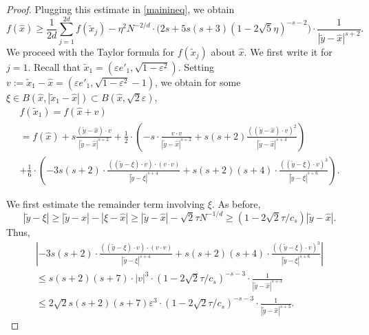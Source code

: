 \documentclass[12pt]{amsart}
\theoremstyle{definition}
\def\sli{\sum\limits}
\def\ep{\varepsilon}
\newcommand{\1}{\mathbf{1}}
\begin{document}
\begin{proof}
Plugging this estimate in \eqref{mainineq}, we obtain
\begin{equation}\label{mainineq2}
f(\hat{x}) \geqslant \frac{1}{2d}\sli_{j=1}^{2d}f(\tilde{x}_j) - \eta^2 N^{-2/d}\cdot \Big(2s+5s (s+3)(1-2\sqrt{5}\eta)^{-s-2}\Big)\cdot \frac{1}{|\tilde y-\hat{x}|^{s+2}}.
\end{equation}
We proceed with the Taylor formula for $f(\tilde x_j)$ about $\hat{x}$. We first write it for $j=1$. Recall that $\tilde{x}_1 = (\ep e'_1, \sqrt{1-\ep^2})$. Setting $v:=\tilde{x}_1-\hat{x} = (\ep e'_1, \sqrt{1-\ep^2}-1)$, we obtain for some \\ $\xi \in B(\hat{x}, |\tilde x_1-\hat{x}|) \subset B(\hat{x}, \sqrt{2}\ep)$,
\begin{multline}\label{supertaylor}
f(\tilde x_1)=f(\hat{x}+v) \\= f(\hat{x})+s\frac{(\tilde y-\hat{x})\cdot v}{|\tilde y-\hat{x}|^{s+2}} +
\frac12 \cdot \left(-s\cdot \frac{v\cdot v}{|\tilde y-\hat{x}|^{s+2}}+s(s+2)\frac{((\tilde y-\hat{x})\cdot v)^2}{|\tilde y-\hat{x}|^{s+4}}\right)  \\
+ \frac16 \cdot \left(-3s(s+2)\cdot \frac{((\tilde y-\xi)\cdot v)\cdot (v\cdot v)}{|\tilde y-\xi|^{s+4}} + s(s+2)(s+4)\cdot \frac{((\tilde y-\xi)\cdot v)^3}{|\tilde y-\xi|^{s+6}}\right).
\end{multline}
 
We first estimate the remainder term involving $\xi$. As before,
$$
|\tilde y-\xi|\geqslant |\tilde y - \hat{x}| - |\xi-\hat{x}|\geqslant |\tilde y - \hat{x}|- \sqrt{2}\tau N^{-1/d}\geqslant (1-2\sqrt{2}\tau/c_s)|\tilde y-\hat{x}|.
$$
Thus,
\begin{multline}\label{error}
\left|-3s(s+2)\cdot \frac{((\tilde y-\xi)\cdot v)\cdot (v\cdot v)}{|\tilde y-\xi|^{s+4}} + s(s+2)(s+4)\cdot \frac{((\tilde y-\xi)\cdot v)^3}{|\tilde y-\xi|^{s+6}}\right| \\
\leqslant
 s(s+2)(s+7)\cdot |v|^3 \cdot (1-2\sqrt{2}\tau/c_s)^{-s-3}\cdot \frac{1}{|\tilde y-\hat{x}|^{s+3}} \\
\leqslant 
2\sqrt{2}s(s+2)(s+7)\ep^3 \cdot (1-2\sqrt{2}\tau/c_s)^{-s-3}\cdot \frac{1}{|\tilde y-\hat{x}|^{s+3}}.
\end{multline}


\end{proof}
\end{document}
